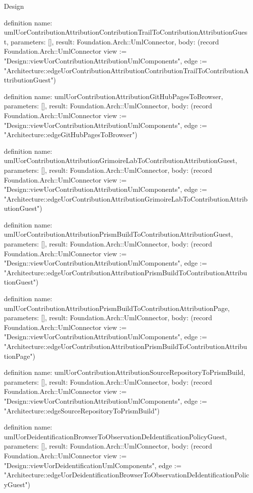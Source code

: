 \begin{lexlean}{Design}
\begin{semanticmodule}
definition{
  name: umlUorContributionAttributionContributionTrailToContributionAttributionGuest,
  parameters: [],
  result: Foundation.Arch::UmlConnector,
  body: (record Foundation.Arch::UmlConnector {view := "Design::viewUorContributionAttributionUmlComponents", edge := "Architecture::edgeUorContributionAttributionContributionTrailToContributionAttributionGuest"})
}

definition{
  name: umlUorContributionAttributionGitHubPagesToBrowser,
  parameters: [],
  result: Foundation.Arch::UmlConnector,
  body: (record Foundation.Arch::UmlConnector {view := "Design::viewUorContributionAttributionUmlComponents", edge := "Architecture::edgeGitHubPagesToBrowser"})
}

definition{
  name: umlUorContributionAttributionGrimoireLabToContributionAttributionGuest,
  parameters: [],
  result: Foundation.Arch::UmlConnector,
  body: (record Foundation.Arch::UmlConnector {view := "Design::viewUorContributionAttributionUmlComponents", edge := "Architecture::edgeUorContributionAttributionGrimoireLabToContributionAttributionGuest"})
}

definition{
  name: umlUorContributionAttributionPrismBuildToContributionAttributionGuest,
  parameters: [],
  result: Foundation.Arch::UmlConnector,
  body: (record Foundation.Arch::UmlConnector {view := "Design::viewUorContributionAttributionUmlComponents", edge := "Architecture::edgeUorContributionAttributionPrismBuildToContributionAttributionGuest"})
}

definition{
  name: umlUorContributionAttributionPrismBuildToContributionAttributionPage,
  parameters: [],
  result: Foundation.Arch::UmlConnector,
  body: (record Foundation.Arch::UmlConnector {view := "Design::viewUorContributionAttributionUmlComponents", edge := "Architecture::edgeUorContributionAttributionPrismBuildToContributionAttributionPage"})
}

definition{
  name: umlUorContributionAttributionSourceRepositoryToPrismBuild,
  parameters: [],
  result: Foundation.Arch::UmlConnector,
  body: (record Foundation.Arch::UmlConnector {view := "Design::viewUorContributionAttributionUmlComponents", edge := "Architecture::edgeSourceRepositoryToPrismBuild"})
}

definition{
  name: umlUorDeidentificationBrowserToObservationDeIdentificationPolicyGuest,
  parameters: [],
  result: Foundation.Arch::UmlConnector,
  body: (record Foundation.Arch::UmlConnector {view := "Design::viewUorDeidentificationUmlComponents", edge := "Architecture::edgeUorDeidentificationBrowserToObservationDeIdentificationPolicyGuest"})
}


\end{semanticmodule}
\end{lexlean}

